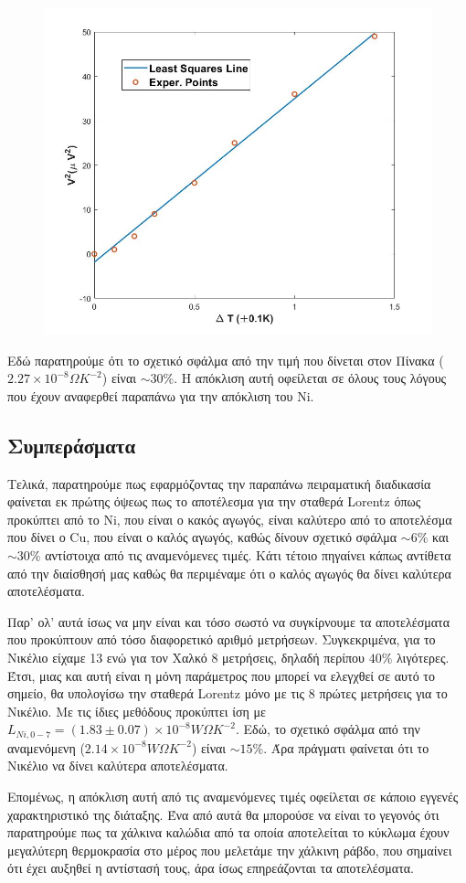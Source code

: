 \documentclass[a4paper]{article}
\begin{document}
				\newpage
				
			\begin{figure}[!h]
				\centering
				\includegraphics[width=0.7\linewidth]{plot_cu.jpg}
				\caption{ }
				\label{im3}
			\end{figure}
			
			Εδώ παρατηρούμε ότι το σχετικό σφάλμα από την τιμή που δίνεται στον Πίνακα ($2.27\times10^{-8}\Omega K^{-2}$) είναι $\sim30\%$. Η απόκλιση αυτή οφείλεται σε όλους τους λόγους που έχουν αναφερθεί παραπάνω για την απόκλιση του Ni. 
			
			
\subsection*{Συμπεράσματα}


	Τελικά, παρατηρούμε πως εφαρμόζοντας την παραπάνω πειραματική διαδικασία φαίνεται εκ πρώτης όψεως πως το αποτέλεσμα για την σταθερά Lorentz όπως προκύπτει από το Ni, που είναι ο κακός αγωγός, είναι καλύτερο από το αποτελέσμα που δίνει ο Cu, που είναι ο καλός αγωγός, καθώς δίνουν σχετικό σφάλμα $\sim6\%$ και $\sim30\%$ αντίστοιχα από τις αναμενόμενες τιμές. Κάτι τέτοιο πηγαίνει κάπως αντίθετα από την διαίσθησή μας καθώς θα περιμέναμε ότι ο καλός αγωγός θα δίνει καλύτερα αποτελέσματα. 
	
	Παρ' ολ' αυτά ίσως να μην είναι και τόσο σωστό να συγκίρνουμε τα αποτελέσματα που προκύπτουν από τόσο διαφορετικό αριθμό μετρήσεων. Συγκεκριμένα, για το Νικέλιο είχαμε 13 ενώ για τον Χαλκό 8 μετρήσεις, δηλαδή περίπου $40\%$ λιγότερες. Έτσι, μιας και αυτή είναι η μόνη παράμετρος που μπορεί να ελεγχθεί σε αυτό το σημείο, θα υπολογίσω την σταθερά Lorentz μόνο με τις 8 πρώτες μετρήσεις για το Νικέλιο. Με τις ίδιες μεθόδους προκύπτει ίση με $L_{Ni,0-7} = ( 1.83 \pm 0.07 ) \times10^{-8}W\Omega K^{-2}$.  Εδώ, το σχετικό σφάλμα από την αναμενόμενη ($2.14\times10^{-8}W\Omega K^{-2}$) είναι $\sim15\%$. Άρα πράγματι φαίνεται ότι το Νικέλιο να δίνει καλύτερα αποτελέσματα. 
	
	Επομένως, η απόκλιση αυτή από τις αναμενόμενες τιμές οφείλεται σε κάποιο εγγενές χαρακτηριστικό της διάταξης. Ένα από αυτά θα μπορούσε να είναι το γεγονός ότι παρατηρούμε πως τα χάλκινα καλώδια από τα οποία αποτελείται το κύκλωμα έχουν μεγαλύτερη θερμοκρασία στο μέρος που μελετάμε την χάλκινη ράβδο, που σημαίνει ότι έχει αυξηθεί η αντίστασή τους, άρα ίσως επηρεάζονται τα αποτελέσματα.
\end{document}
